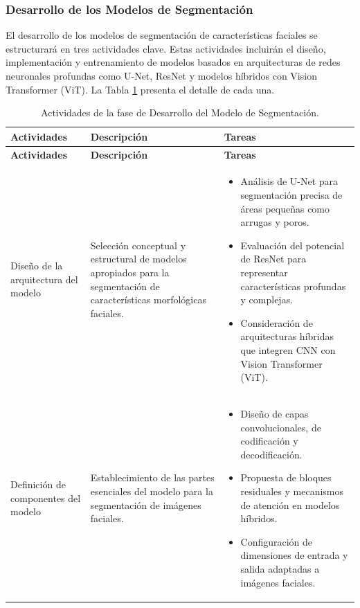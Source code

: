  \subsubsection{Desarrollo de los Modelos de Segmentación}
 El desarrollo de los modelos de segmentación de características faciales se estructurará en tres actividades clave. Estas actividades incluirán el diseño, implementación y entrenamiento de modelos basados en arquitecturas de redes neuronales profundas como U-Net, ResNet y modelos híbridos con Vision Transformer (ViT). La Tabla \ref{tabla:actividades_segmentacion} presenta el detalle de cada una.

 \vspace{2ex}
 \begingroup
 \renewcommand\arraystretch{1.2}
 \begin{longtable}{>{\raggedright\arraybackslash}p{4cm} >{\raggedright\arraybackslash}p{4cm} >{\raggedright\arraybackslash}p{5cm}}
 \caption{Actividades de la fase de Desarrollo del Modelo de Segmentación.}
 \label{tabla:actividades_segmentacion}\\
 \toprule
 \textbf{Actividades} & \textbf{Descripción} & \textbf{Tareas} \\
 \midrule
 \endfirsthead
 
 \toprule
 \textbf{Actividades} & \textbf{Descripción} & \textbf{Tareas} \\
 \midrule
 \endhead
 
 \bottomrule
 \endfoot
 
 Diseño de la arquitectura del modelo & Selección conceptual y estructural de modelos apropiados para la segmentación de características morfológicas faciales. &
 \begin{itemize}
     \item Análisis de U-Net para segmentación precisa de áreas pequeñas como arrugas y poros.
     \item Evaluación del potencial de ResNet para representar características profundas y complejas.
     \item Consideración de arquitecturas híbridas que integren CNN con Vision Transformer (ViT).
 \end{itemize} \\
 
 Definición de componentes del modelo & Establecimiento de las partes esenciales del modelo para la segmentación de imágenes faciales. &
 \begin{itemize}
     \item Diseño de capas convolucionales, de codificación y decodificación.
     \item Propuesta de bloques residuales y mecanismos de atención en modelos híbridos.
     \item Configuración de dimensiones de entrada y salida adaptadas a imágenes faciales.
 \end{itemize} \\
 

\end{longtable}
